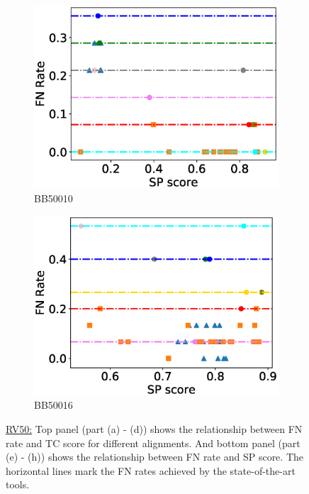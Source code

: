 \begin{figure}[!htbp]
\begin{adjustwidth}{-1cm}{-1cm}
\begin{subfigure}{0.22\textwidth}
			\includegraphics[width=\columnwidth]{Figure/summary/precomputedInit/Balibase/BB50010_fnrate_vs_sp_2}
			\caption{BB50010}
		\end{subfigure}
		\begin{subfigure}{0.22\textwidth}
			\includegraphics[width=\columnwidth]{Figure/summary/precomputedInit/Balibase/BB50016_fnrate_vs_sp_2}
			\caption{BB50016}
		\end{subfigure}	
		\caption{\underline{RV50:} Top panel (part (a) - (d)) shows the relationship between FN rate and TC score for different alignments. And bottom panel (part (e) - (h)) shows the relationship between FN rate and SP score. The horizontal lines mark the FN rates achieved by the state-of-the-art tools.}
		\label{fig:rv50_fnrate_vs_tc}
	\end{adjustwidth}
\end{figure}

